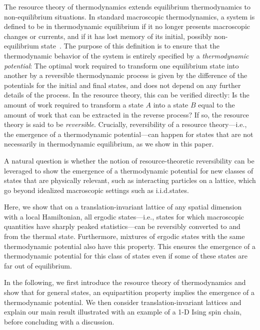 \documentclass[prl,reprint,longbibliography,superscriptaddress]{revtex4-1}
\begin{document}
The resource theory of thermodynamics extends equilibrium thermodynamics to
non-equilibrium situations.
%
In standard macroscopic thermodynamics, a system is defined to be in
thermodynamic equilibrium if it no longer presents macroscopic changes or
currents, and if it has lost memory of its initial, possibly non-equilibrium
state~\cite{BookCallen_Thermo}.  The purpose of this definition is to ensure
that the thermodynamic behavior of the system is entirely specified by a
\emph{thermodynamic potential}: The optimal work required to transform one
equilibrium state into another by a reversible thermodynamic process is given by
the difference of the potentials for the initial and final states, and does not
depend on any further details of the process.
%
In the resource theory, this can be verified directly: Is the amount of work
required to transform a state $A$ into a state $B$ equal to the amount of work
that can be extracted in the reverse process?  If so, the resource theory is
said to be \emph{reversible}.  Crucially, reversibility of a resource
theory---i.e., the emergence of a thermodynamic potential---can happen for
states that are not necessarily in thermodynamic equilibrium, as we show in this
paper.

%
A natural question is whether the notion of resource-theoretic reversibility can
be leveraged to show the emergence of a thermodynamic potential for new classes
of states that are physically relevant, such as interacting particles on a
lattice, which go beyond idealized macroscopic settings such as i.i.d.\@ states.


Here, we show that on a translation-invariant lattice of any spatial dimension
with a local Hamiltonian, all ergodic states---i.e., states for which
macroscopic quantities have sharply peaked statistics---can be reversibly
converted to and from the thermal state.  Furthermore, mixtures of ergodic
states with the same thermodynamic potential also have this property.  This
ensures the emergence of a thermodynamic potential for this class of states even
if some of these states are far out of equilibrium.


In the following, we first introduce the resource theory of thermodynamics and
show that for general states, an equipartition property implies the emergence of
a thermodynamic potential.  We then consider translation-invariant lattices and
explain our main result illustrated with an example of a 1-D Ising spin chain,
before concluding with a discussion.
\end{document}
